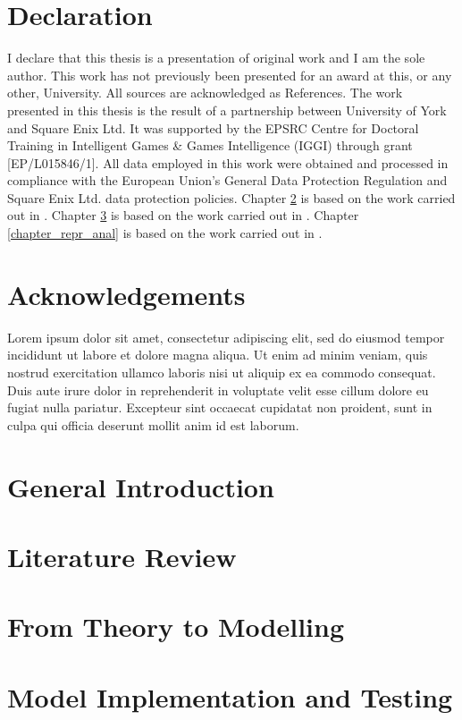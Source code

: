 \documentclass{yorkThesis}
\newcommand{\lorem}{Lorem ipsum dolor sit amet, consectetur adipiscing elit, sed do eiusmod tempor incididunt ut labore et dolore magna aliqua. Ut enim ad minim veniam, quis nostrud exercitation ullamco laboris nisi ut aliquip ex ea commodo consequat. Duis aute irure dolor in reprehenderit in voluptate velit esse cillum dolore eu fugiat nulla pariatur. Excepteur sint occaecat cupidatat non proident, sunt in culpa qui officia deserunt mollit anim id est laborum.\\}
\begin{document}
\chapter*{Declaration}
I declare that this thesis is a presentation of original work and I am the sole author. This work has not previously been presented for an award at this, or any other, University. All sources are acknowledged as References. The work presented in this thesis is the result of a partnership between University of York and Square Enix Ltd. It was supported by the EPSRC Centre for Doctoral Training in Intelligent Games \& Games Intelligence (IGGI) through grant [EP/L015846/1]. All data employed in this work were obtained and processed in compliance with the European Union's General Data Protection Regulation \cite{EUdataregulations2018} and Square Enix Ltd. data protection policies. Chapter \ref{chapter_theory_modelling} is based on the work carried out in \cite{bonometti2020theory, bonometti2021approximating}. Chapter \ref{chapter_implementation_testing} is based on the work carried out in \cite{bonometti2019modelling, bonometti2020theory, bonometti2021approximating}. Chapter \ref{chapter_repr_anal} is based on the work carried out in \cite{bonometti2021approximating}.

\chapter*{Acknowledgements}
\lorem

\chapter*{General Introduction}
\label{chapter_intro}


\tableofcontents


\chapter{Literature Review}
\label{chapter_lit_review}


\chapter{From Theory to Modelling}
\label{chapter_theory_modelling}


\chapter{Model Implementation and Testing}
\label{chapter_implementation_testing}

\end{document}
